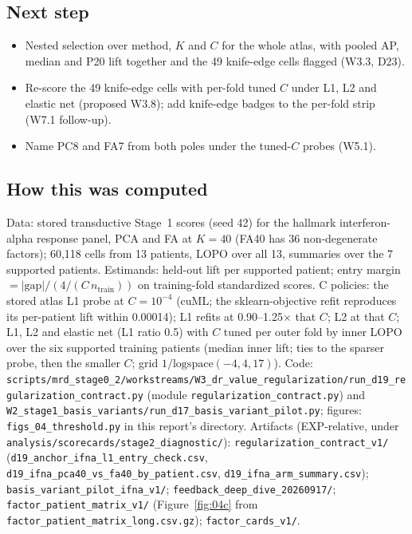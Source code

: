 \subsection*{Next step}
\begin{itemize}
  \item Nested selection over method, $K$ and $C$ for the whole atlas, with pooled AP, median and P20 lift together and the 49 knife-edge cells flagged (W3.3, D23).
  \item Re-score the 49 knife-edge cells with per-fold tuned $C$ under L1, L2 and elastic net (proposed W3.8); add knife-edge badges to the per-fold strip (W7.1 follow-up).
  \item Name PC8 and FA7 from both poles under the tuned-$C$ probes (W5.1).
\end{itemize}

\subsection*{How this was computed}
{\small\raggedright
Data: stored transductive Stage~1 scores (seed 42) for the hallmark interferon-alpha response panel, PCA and FA at $K = 40$ (FA40 has 36 non-degenerate factors); 60,118 cells from 13 patients, LOPO over all 13, summaries over the 7 supported patients. Estimands: held-out lift per supported patient; entry margin $= |\mathrm{gap}|/(4/(C\,n_{\mathrm{train}}))$ on training-fold standardized scores. C policies: the stored atlas L1 probe at $C = 10^{-4}$ (cuML; the sklearn-objective refit reproduces its per-patient lift within 0.00014\pp); L1 refits at 0.90--1.25$\times$ that $C$; L2 at that $C$; L1, L2 and elastic net (L1 ratio 0.5) with $C$ tuned per outer fold by inner LOPO over the six supported training patients (median inner lift; ties to the sparser probe, then the smaller $C$; grid $1/\mathrm{logspace}(-4, 4, 17)$). Code: \texttt{scripts/\allowbreak mrd\_stage0\_2/\allowbreak workstreams/\allowbreak W3\_dr\_value\_regularization/\allowbreak run\_d19\_\allowbreak regularization\_\allowbreak contract.py} (module \texttt{regularization\_\allowbreak contract.py}) and \texttt{W2\_stage1\_\allowbreak basis\_variants/\allowbreak run\_d17\_\allowbreak basis\_variant\_pilot.py}; figures: \texttt{figs\_04\_threshold.py} in this report's directory. Artifacts (EXP-relative, under \texttt{analysis/\allowbreak scorecards/\allowbreak stage2\_diagnostic/}): \texttt{regularization\_\allowbreak contract\_v1/} (\texttt{d19\_anchor\_\allowbreak ifna\_l1\_entry\_check.csv}, \texttt{d19\_ifna\_\allowbreak pca40\_vs\_fa40\_by\_patient.csv}, \texttt{d19\_ifna\_\allowbreak arm\_summary.csv}); \texttt{basis\_variant\_\allowbreak pilot\_ifna\_v1/}; \texttt{feedback\_deep\_\allowbreak dive\_20260917/}; \texttt{factor\_patient\_\allowbreak matrix\_v1/} (Figure~\ref{fig:04c} from \texttt{factor\_patient\_\allowbreak matrix\_long.csv.gz}); \texttt{factor\_cards\_v1/}.
\par}
